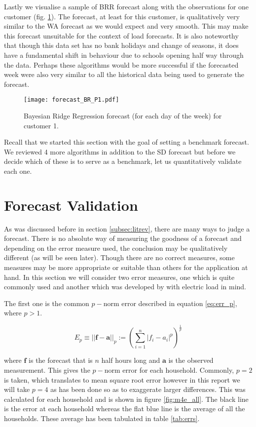 Lastly we visualise a sample of BRR forecast along with the observations for one customer (fig. \ref{fig:BR_forecast_P1}). The forecast, at least for this customer, is qualitatively very similar to the WA forecast as we would expect and very smooth. This may make this forecast unsuitable for the context of load forecasts. It is also noteworthy that though this data set has no bank holidays and change of seasons, it does have a fundamental shift in behaviour due to schools opening half way through the data. Perhaps these algorithms would be more successful if the forecasted week were also very similar to all the historical data being used to generate the forecast.

\begin{figure}
\centering
\texttt{[image: forecast\_BR\_P1.pdf]}
\caption{Bayesian Ridge Regression forecast (for each day of the week) for customer 1.}
\label{fig:BR_forecast_P1} 
\end{figure}


Recall that we started this section with the goal of setting a benchmark forecast. We reviewed 4 more algorithms in addition to the SD forecast but before we decide which of these is to serve as a benchmark, let us quantitatively validate each one.

\section{Forecast Validation} \label{subsec:errs}
As was discussed before in section \ref{subsec:litrev}, there are many ways to judge a forecast. There is no absolute way of measuring the goodness of a forecast and depending on the error measure used, the conclusion may be qualitatively different (as will be seen later). Though there are no correct measures, some measures may be more appropriate or suitable than others for the application at hand. In this section we will consider two error measures, one which is quite commonly used and another which was developed by \cite{dan14} with electric load in mind.

The first one is the common $p-$norm error described in equation \ref{eq:err_p}, where $ p > 1 $.

\begin{equation}\label{eq:err_p}
E_p \equiv ||\boldsymbol{f} - \boldsymbol{a}||_p := \left( \sum_{i=1}^{n} |f_i - a_i |^p\right)^{\frac{1}{p}}
\end{equation}

where $\boldsymbol{f}$ is the forecast that is $n$ half hours long and $\boldsymbol{a}$ is the observed measurement. This gives the $p-$norm error for each household. Commonly, $p=2$ is taken, which translates to mean square root error however in this report we will take $p=4$ as has been done \citet{dan14} so as to exaggerate larger differences. This was calculated for each household and is shown in figure \ref{fig:m4e_all}. The black line is the error at each household whereas the flat blue line is the average of all the households. These average has been tabulated in table \ref{tab:errs}.

